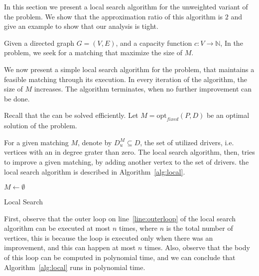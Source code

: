 \label{sub:uwcm}
In this section we present a local search algorithm for the unweighted
variant of the problem.
We show that the approximation ratio of this algorithm is $2$ and give an example
to show that our analysis is tight.

Given a directed graph $G = (V, E)$, 
and a capacity function ${c : V \rightarrow \mathbb{N}}$, 
In the \textsc{\UWCARPOOL{}} problem, 
we seek for a matching that maximize the size of $M$.

We now present a simple local search algorithm for the problem, 
that maintains a feasible matching through its execution.
In every iteration of the algorithm, the size of $M$ increases.
The algorithm terminates, when no further improvement can be done. 

Recall that the \FIXEDCARPOOL{} can be solved efficiently.
Let $M = \text{opt}_{fixed}(P, D)$ be an optimal solution of the
\FIXEDCARPOOL{} problem.
%

For a given matching $M$, denote by $D^M_u \subseteq D$, 
the set of utilized drivers, 
i.e. vertices with an in degree grater than zero.
The local search algorithm, then, tries to improve a given matching, 
by adding another vertex to the set of drivers.
the local search algorithm is described in
Algorithm~\ref{alg:local}.

\begin{algorithm}

\label{alg:local}


$M \leftarrow \emptyset$					\\

\caption{Local Search}
\end{algorithm}

First, observe that the outer loop on line~\ref{line:outerloop} of the local search algorithm
can be executed at most $n$ times, 
where $n$ is the total number of vertices, 
this is because the loop is executed only when there was an improvement, 
and this can happen at most $n$ times.
Also, observe that the body of this loop can be computed in polynomial time, 
and we can conclude that Algorithm~\ref{alg:local} runs in polynomial time.
    
